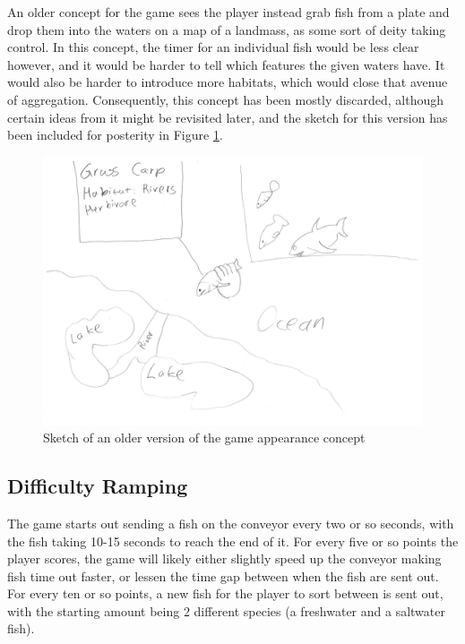 \documentclass[12pt, a4paper]{article}
\begin{document}
An older concept for the game sees the player instead grab fish from a plate and drop them into the waters on a map of a landmass, as some sort of deity taking control. In this concept, the timer for an individual fish would be less clear however, and it would be harder to tell which features the given waters have. It would also be harder to introduce more habitats, which would close that avenue of aggregation. Consequently, this concept has been mostly discarded, although certain ideas from it might be revisited later, and the sketch for this version has been included for posterity in Figure \ref{GameConceptSketch1}.
\begin{figure}
\centering
\includegraphics[width=\textwidth]{Sketches/GameConcept1.png}
\caption{Sketch of an older version of the game appearance concept}\label{GameConceptSketch1}
\end{figure}

\subsection{Difficulty Ramping}
The game starts out sending a fish on the conveyor every two or so seconds, with the fish taking 10-15 seconds to reach the end of it. For every five or so points the player scores, the game will likely either slightly speed up the conveyor making fish time out faster, or lessen the time gap between when the fish are sent out. For every ten or so points, a new fish for the player to sort between is sent out, with the starting amount being 2 different species (a freshwater and a saltwater fish).\\
\end{document}

